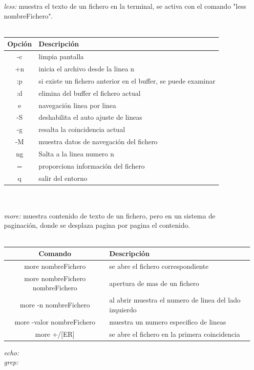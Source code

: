 \documentclass[10pt,a4paper,titlepage]{article}
\begin{document}
	\emph{less:} muestra el texto de un fichero en la terminal, se activa con el comando "less nombreFichero".
	\\
	\\
	\begin{tabular}{|c|p{8cm}|}
		\hline
		Opción & Descripción \\
		\hline
		-c & limpia pantalla \\
		\hline
		+n & inicia el archivo desde la linea n \\
		\hline
		:p & si existe un fichero anterior en el buffer, se puede examinar \\
		\hline
		:d & elimina del buffer el fichero actual \\
		\hline
		e & navegación linea por linea \\
		\hline
		-S & deshabilita el auto ajuste de lineas \\
		\hline
		-g & resalta la coincidencia actual \\
		\hline
		-M & muestra datos de navegación del fichero \\
		\hline
		ng & Salta a la linea numero n \\
		\hline
		= & proporciona información del fichero \\
		\hline
		q & salir del entorno \\
		\hline
	\end{tabular}
	\\
	\\
	\emph{more:} muestra contenido de texto de un fichero, pero en un sistema de paginación, donde se desplaza pagina por pagina el contenido.
	\\
	\\
	\begin{tabular}{|c|p{8cm}|}
		\hline
		Comando & Descripción \\
		\hline
		more nombreFichero & se abre el fichero correspondiente \\
		\hline
		more nombreFichero nombreFichero & apertura de mas de un fichero \\
		\hline
		more -n nombreFichero & al abrir muestra el numero de linea del lado izquierdo \\
		\hline
		more -valor nombreFichero & muestra un numero especifico de lineas \\
		\hline
		more +/[ER] & se abre el fichero en la primera coincidencia \\
		\hline
	\end{tabular}
	\emph{echo:}
	\\
	\emph{grep:}
	
\end{document}
